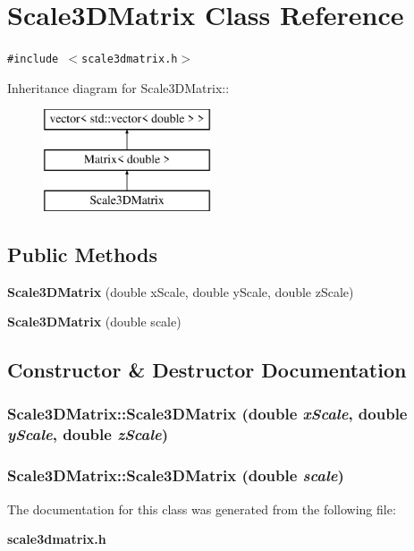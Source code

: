 \section{Scale3DMatrix Class Reference}
\label{classScale3DMatrix}
{\tt \#include $<$scale3dmatrix.h$>$}

Inheritance diagram for Scale3DMatrix::\begin{figure}[H]
\begin{center}
\leavevmode
\includegraphics[height=3cm]{classScale3DMatrix}
\end{center}
\end{figure}
\subsection*{Public Methods}
\begin{CompactItemize}
\item 
{\bf Scale3DMatrix} (double x\-Scale, double y\-Scale, double z\-Scale)
\item 
{\bf Scale3DMatrix} (double scale)
\end{CompactItemize}


\subsection{Constructor \& Destructor Documentation}
\subsubsection{\setlength{\rightskip}{0pt plus 5cm}Scale3DMatrix::Scale3DMatrix (double {\em x\-Scale}, double {\em y\-Scale}, double {\em z\-Scale})\hspace{0.3cm}{\tt  [inline]}}\label{classScale3DMatrix_a0}


\subsubsection{\setlength{\rightskip}{0pt plus 5cm}Scale3DMatrix::Scale3DMatrix (double {\em scale})\hspace{0.3cm}{\tt  [inline]}}\label{classScale3DMatrix_a1}




The documentation for this class was generated from the following file:\begin{CompactItemize}
\item 
{\bf scale3dmatrix.h}\end{CompactItemize}
